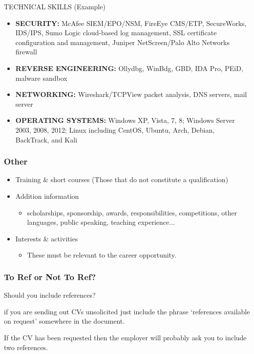 \begin{frame}
	TECHNICAL SKILLS (Example)
	\begin{itemize}
		\item \textbf{SECURITY: }McAfee SIEM/EPO/NSM, FireEye CMS/ETP, SecureWorks, IDS/IPS, Sumo Logic cloud-based log management, SSL certificate configuration and management, Juniper NetScreen/Palo Alto Networks firewall
		\item \textbf{REVERSE ENGINEERING: } Ollydbg, WinBdg, GBD, IDA Pro, PEiD, malware sandbox
		\item \textbf{NETWORKING: } Wireshark/TCPView packet analysis, DNS servers, mail server
		\item \textbf{OPERATING SYSTEMS:} Windows XP, Vista, 7, 8; Windows Server 2003, 2008, 2012; Linux including CentOS, Ubuntu, Arch, Debian, BackTrack, and Kali
	\end{itemize}
\end{frame}

\begin{frame}
	\frametitle{Other}
	
	\begin{itemize}
		\item Training \& short courses (Those that do not constitute a qualification)
		\item Addition information \pause
		\begin{itemize}
			\item scholarships, sponsorship, awards, responsibilities, competitions, other languages, public speaking, teaching experience...
		\end{itemize}
		\item Interests \& activities
		\begin{itemize}
			\item These must be relevant to the career opportunity.
		\end{itemize}
	\end{itemize}
\end{frame}

\begin{frame}
	\frametitle{ To Ref or Not To Ref?}
	
	Should you include references?
	\pause
	
	if you are sending out CVs unsolicited just include the phrase `references available on request' somewhere in the document.
	
	\pause
	
	If the CV has been requested then the employer will probably ask you to include two references.
	
\end{frame}

